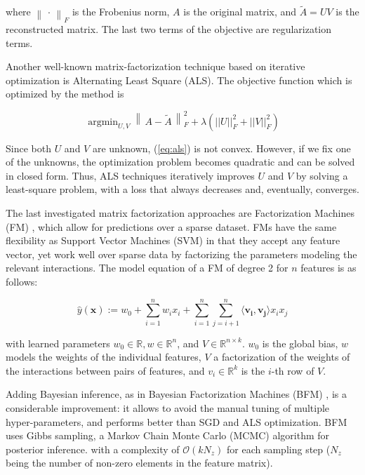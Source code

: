 \documentclass[sigconf]{acmart}
\DeclareMathOperator*{\argmin}{argmin}
\begin{document}
where $\left\lVert \, \cdot \, \right\rVert_F$ is the Frobenius norm, $A$ is the original matrix, and $\widetilde{A} = UV$ is the reconstructed matrix. The last two terms of the objective are regularization terms.  

Another well-known matrix-factorization technique based on iterative optimization is Alternating Least Square (ALS). The objective function which is optimized by the method is 

\begin{equation}
\label{eq:als}
    \argmin_{U,V} \left\lVert \, A - \widetilde{A} \,\right\rVert_F^2 + \lambda \left( ||U||_F^2 + ||V||_F^2 \right)
\end{equation}

Since both $U$ and $V$ are unknown, (\ref{eq:als}) is not convex. However, if we fix one of the unknowns, the optimization problem becomes quadratic and can be solved in closed form.
Thus, ALS techniques iteratively improves $U$ and $V$ by solving a least-square problem, with a loss that always decreases and, eventually, converges.

The last investigated matrix factorization approaches are Factorization Machines (FM) \cite{Rendle2010FactorizationM}, which allow for predictions over a sparse dataset. FMs have the same flexibility as Support Vector Machines (SVM) in that they accept any feature vector, yet work well over sparse data by factorizing the parameters modeling the relevant interactions. The model equation of a FM of degree 2 for $n$ features is as follows:

\footnotesize
\begin{equation}
\hat{y}(\boldsymbol{x}) := w_0 + \sum_{i=1}^n{w_i x_i} + \sum_{i=1}^n\sum_{j=i+1}^n{\langle \boldsymbol{v_i}, \boldsymbol{v_j} \rangle x_i x_j}
\end{equation}
\normalsize

\noindent
with learned parameters $w_0 \in \mathbb{R}, w \in \mathbb{R}^n$, and $V \in \mathbb{R}^{n \times k}$. $w_0$ is the global bias, $w$ models the weights of the individual features, $V$ a factorization of the weights of the interactions between pairs of features, and $v_i \in \mathbb{R}^k$ is the $i$-th row of $V$.


Adding Bayesian inference, as in Bayesian Factorization Machines (BFM) \cite{Freudenthaler2011BayesianFM}, is a considerable improvement: it allows to avoid the manual tuning of multiple hyper-parameters, and performs better than SGD and ALS optimization. 
BFM uses Gibbs sampling, a Markov Chain Monte Carlo (MCMC) algorithm for posterior inference.
with a complexity of $\mathcal{O}(k N_z)$ for each sampling step ($N_z$ being the number of non-zero elements in the feature matrix).
\end{document}
